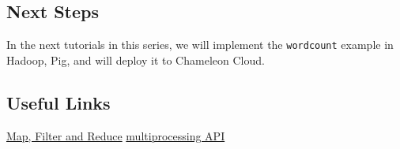 \subsection{Next Steps}\label{next-steps}

In the next tutorials in this series, we will implement the
\texttt{wordcount} example in Hadoop, Pig, and will deploy it to
Chameleon Cloud.

\subsection{Useful Links}\label{useful-links}

\href{http://book.pythontips.com/en/latest/map_filter.html}{Map, Filter
and Reduce}
\href{https://docs.python.org/2/library/multiprocessing.html}{multiprocessing
API}
